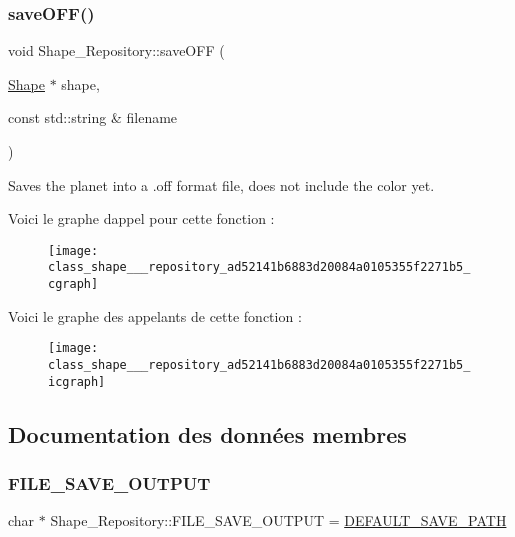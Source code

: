 \subsubsection{\texorpdfstring{save\+O\+F\+F()}{saveOFF()}}
{\footnotesize\ttfamily void Shape\+\_\+\+Repository\+::save\+O\+FF (\begin{DoxyParamCaption}\item[{\hyperlink{class_shape}{Shape} $\ast$}]{shape,  }\item[{const std\+::string \&}]{filename }\end{DoxyParamCaption})\hspace{0.3cm}{\ttfamily [static]}}



Saves the planet into a .off format file, does not include the color yet. 

Voici le graphe d\textquotesingle{}appel pour cette fonction \+:
\nopagebreak
\begin{figure}[H]
\begin{center}
\leavevmode
\texttt{[image: class\_shape\_\_\_repository\_ad52141b6883d20084a0105355f2271b5\_cgraph]}
\end{center}
\end{figure}
Voici le graphe des appelants de cette fonction \+:
\nopagebreak
\begin{figure}[H]
\begin{center}
\leavevmode
\texttt{[image: class\_shape\_\_\_repository\_ad52141b6883d20084a0105355f2271b5\_icgraph]}
\end{center}
\end{figure}


\subsection{Documentation des données membres}
\mbox{\label{class_shape___repository_a86acda4a6616af042c18e10f16a57230}} 
\subsubsection{\texorpdfstring{F\+I\+L\+E\+\_\+\+S\+A\+V\+E\+\_\+\+O\+U\+T\+P\+UT}{FILE\_SAVE\_OUTPUT}}
{\footnotesize\ttfamily char $\ast$ Shape\+\_\+\+Repository\+::\+F\+I\+L\+E\+\_\+\+S\+A\+V\+E\+\_\+\+O\+U\+T\+P\+UT = \hyperlink{shape__repository_8h_acc70ede7a11e005b3c50aa3efb048ddf}{D\+E\+F\+A\+U\+L\+T\+\_\+\+S\+A\+V\+E\+\_\+\+P\+A\+TH}\hspace{0.3cm}{\ttfamily [static]}}



